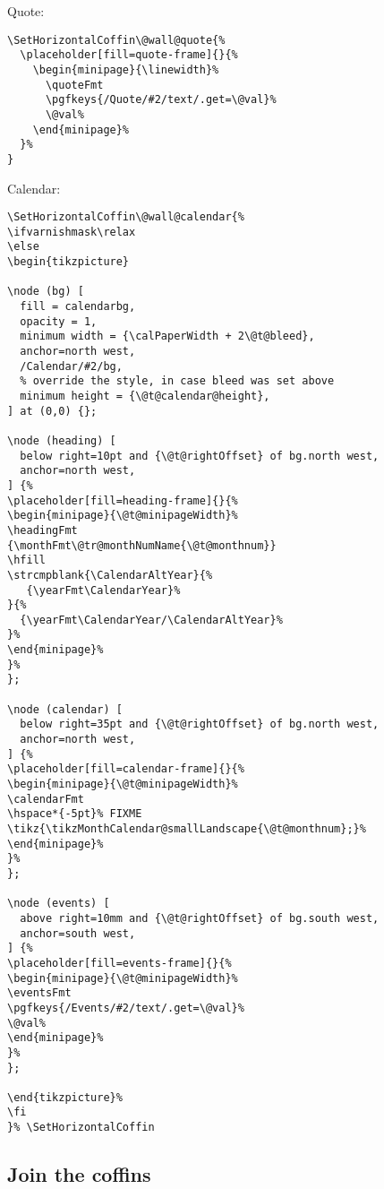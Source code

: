 \documentclass[11pt,oneside]{memoir-article}
\begin{document}
Quote:

\begin{verbatim}
\SetHorizontalCoffin\@wall@quote{%
  \placeholder[fill=quote-frame]{}{%
    \begin{minipage}{\linewidth}%
      \quoteFmt
      \pgfkeys{/Quote/#2/text/.get=\@val}%
      \@val%
    \end{minipage}%
  }%
}
\end{verbatim}

Calendar:

\begin{verbatim}
\SetHorizontalCoffin\@wall@calendar{%
\ifvarnishmask\relax
\else
\begin{tikzpicture}

\node (bg) [
  fill = calendarbg,
  opacity = 1,
  minimum width = {\calPaperWidth + 2\@t@bleed},
  anchor=north west,
  /Calendar/#2/bg,
  % override the style, in case bleed was set above
  minimum height = {\@t@calendar@height},
] at (0,0) {};

\node (heading) [
  below right=10pt and {\@t@rightOffset} of bg.north west,
  anchor=north west,
] {%
\placeholder[fill=heading-frame]{}{%
\begin{minipage}{\@t@minipageWidth}%
\headingFmt
{\monthFmt\@tr@monthNumName{\@t@monthnum}}
\hfill
\strcmpblank{\CalendarAltYear}{%
   {\yearFmt\CalendarYear}%
}{%
  {\yearFmt\CalendarYear/\CalendarAltYear}%
}%
\end{minipage}%
}%
};

\node (calendar) [
  below right=35pt and {\@t@rightOffset} of bg.north west,
  anchor=north west,
] {%
\placeholder[fill=calendar-frame]{}{%
\begin{minipage}{\@t@minipageWidth}%
\calendarFmt
\hspace*{-5pt}% FIXME
\tikz{\tikzMonthCalendar@smallLandscape{\@t@monthnum};}%
\end{minipage}%
}%
};

\node (events) [
  above right=10mm and {\@t@rightOffset} of bg.south west,
  anchor=south west,
] {%
\placeholder[fill=events-frame]{}{%
\begin{minipage}{\@t@minipageWidth}%
\eventsFmt
\pgfkeys{/Events/#2/text/.get=\@val}%
\@val%
\end{minipage}%
}%
};

\end{tikzpicture}%
\fi
}% \SetHorizontalCoffin
\end{verbatim}

\subsection{Join the coffins}
\label{sec:org85d53fc}
\end{document}
